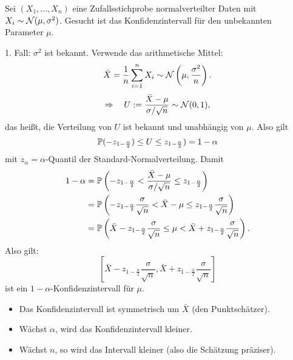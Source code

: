 \begin{exmp}
  Sei $(X_1,\ldots,X_n)$ eine Zufallsstichprobe normalverteilter Daten mit $X_i
  \sim \mathcal{N}(\mu, \sigma^2)$. Gesucht ist das Konfidenzintervall für den
  unbekannten Parameter $\mu$.
  
  1. Fall: $\sigma^2$ ist bekannt. Verwende das arithmetische Mittel:
  \[ \bar{X} = \frac{1}{n} \sum_{i=1}^n X_i \sim \mathcal{N}\left(\mu,
      \frac{\sigma^2}{n}\right). \]
  \[ \Rightarrow \quad U := \frac{\bar{X}-\mu}{\sigma / \sqrt{n} }
    \sim \mathcal{N}(0,1), \]
  das heißt, die Verteilung von $U$ ist bekannt und unabhängig von $\mu$. Also
  gilt
  \[ \mathbb{P}( -z_{1 - \frac{\alpha}{2}}) \le U \le z_{1 - \frac{\alpha}{2}}) = 1
    - \alpha \]
  mit $z_\alpha = \alpha$-Quantil der Standard-Normalverteilung. Damit
  \[ \begin{aligned}
      1-\alpha
      &= \mathbb{P}\left( - z_{1 - \frac{\alpha}{2}} <
        \frac{\bar{X}-\mu}{\sigma/\sqrt{n}} \le z_{1 - \frac{\alpha}{2}}
      \right) \\
      &= \mathbb{P}\left( - z_{1 - \frac{\alpha}{2}} \frac{\sigma}{\sqrt{n}} <
        \bar{X}-\mu
        \le z_{1 - \frac{\alpha}{2}} \frac{\sigma}{\sqrt{n}}
      \right) \\
      &= \mathbb{P} \left( \bar{X} - z_{1 - \frac{\alpha}{2}} \frac{\sigma}{\sqrt{n}} \le
        \mu < \bar{X} +
        z_{1 - \frac{\alpha}{2}} \frac{\sigma}{\sqrt{n}}
      \right).
    \end{aligned}
  \]
  Also gilt:
  \[ \left[ \bar{X} - z_{1 - \frac{\alpha}{2}} \frac{\sigma}{\sqrt{n}},
      \bar{X} + z_{1 - \frac{\alpha}{2}} \frac{\sigma}{\sqrt{n}} \right] \]
  ist ein $1-\alpha$-Konfidenzintervall für $\mu$.
  \begin{itemize}
  \item Das Konfidenzintervall ist symmetrisch um $\bar{X}$ (den
    Punktschätzer).
  \item Wächst $\alpha$, wird das Konfidenzintervall kleiner.
  \item Wächst $n$, so wird das Intervall kleiner (also die Schätzung
    präziser).
  \end{itemize}
  

\end{exmp}
